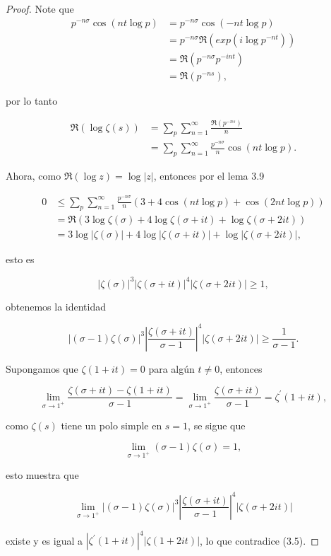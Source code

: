 \begin{proof}
Note que
    \begin{align*}
        p^{-n\sigma}\cos(nt\log p)&=p^{-n\sigma}\cos(-nt\log p)\\
        &=p^{-n\sigma}\Re(exp(i\log p^{-nt}))\\
        &=\Re(p^{-n\sigma}p^{-int})\\
        &=\Re(p^{-ns})
    ,\end{align*}

por lo tanto

\begin{align*}
    \Re(\log\zeta(s))&=\sum_{p}\sum_{n=1}^{\infty} \frac{\Re(p^{-ns})}{n}\\
    &=\sum_{p}\sum_{n=1}^{\infty} \frac{p^{-n\sigma}}{n}\cos(nt\log p)
.\end{align*}

Ahora, como $\Re(\log z)=\log|z|$, entonces por el lema 3.9

\begin{align*}
    0&\leq \sum_p \sum_{n=1}^{\infty}\frac{p^{-n \sigma}}{n}(3+4 \cos (n t \log p)+\cos (2 n t \log p))\\
     &=\Re(3\log\zeta(\sigma)+4\log\zeta(\sigma+it)+\log\zeta(\sigma+2it))\\
    &=3 \log |\zeta(\sigma)|+4 \log |\zeta(\sigma+i t)|+\log |\zeta(\sigma+2 i t)|
,\end{align*}

esto es

$$
|\zeta(\sigma)|^3|\zeta(\sigma+i t)|^4|\zeta(\sigma+2 i t)| \geqslant 1,
$$

obtenemos la identidad

\begin{equation}
    |(\sigma-1) \zeta(\sigma)|^3\left|\frac{\zeta(\sigma+i t)}{\sigma-1}\right|^4|\zeta(\sigma+2 i t)| \geqslant \frac{1}{\sigma-1} .
\end{equation}

Supongamos que $\zeta(1+it)=0$ para algún $t\neq 0$, entonces

$$\lim_{\sigma \to 1^+}\frac{\zeta(\sigma+it)-\zeta(1+it)}{\sigma-1}=\lim_{\sigma \to 1^+}\frac{\zeta(\sigma+it)}{\sigma-1}=\zeta^{\prime}(1+it),$$

como $\zeta(s)$ tiene un polo simple en $s=1$, se sigue que

$$\lim_{\sigma \to 1^+} (\sigma-1)\zeta(\sigma)=1,$$

esto muestra que 

$$\lim _{\sigma \to 1^+}|(\sigma-1) \zeta(\sigma)|^3\left|\frac{\zeta(\sigma+i t)}{\sigma-1}\right|^4|\zeta(\sigma+2 i t)|$$

existe y es igual a $\left|\zeta^{\prime}(1+i t)\right|^4|\zeta(1+2 i t)|$, lo que contradice (3.5).
\end{proof}

